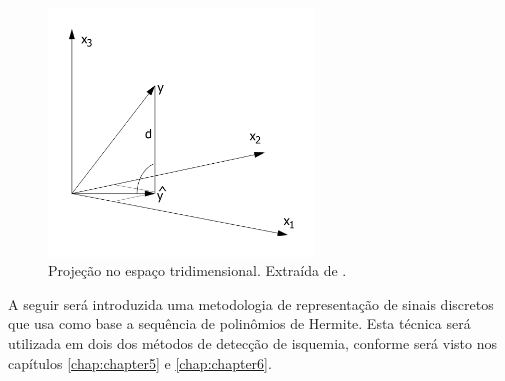 \begin{figure}[ht!]
    \centering
    \includegraphics[width=200pt]{figures/chap3-three-dim.pdf}
    \caption[Projeção no espaço tridimensional]{Projeção no espaço tridimensional. Extraída de \cite{Vetterli1995}.}
    \label{fig:three-dim}
\end{figure}

A seguir será introduzida uma metodologia de representação de sinais discretos que usa como base a sequência de polinômios de Hermite. Esta técnica será utilizada em dois dos métodos de detecção de isquemia, conforme será visto nos capítulos \ref{chap:chapter5} e \ref{chap:chapter6}.


